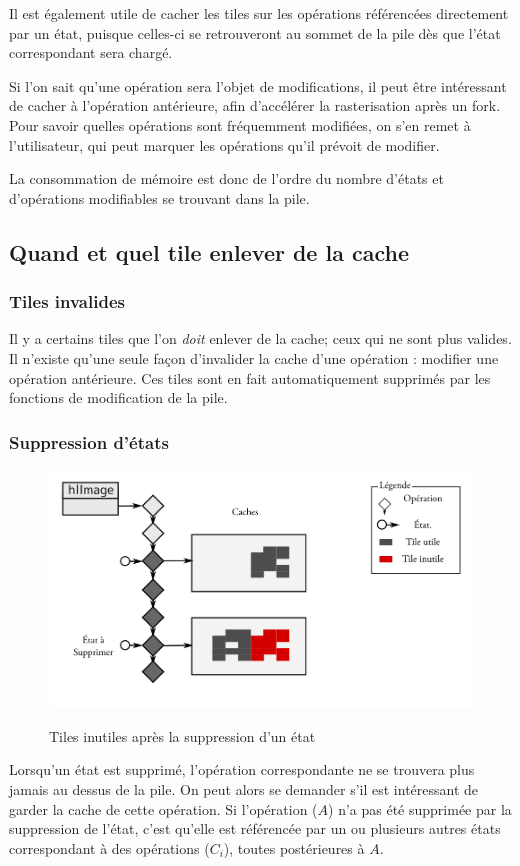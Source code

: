 			Il est également utile de cacher les tiles sur les opérations référencées directement par un état, puisque
			celles-ci se retrouveront au sommet de la pile dès que l'état correspondant sera chargé. 

			Si l'on sait qu'une opération sera l'objet de modifications, il peut être intéressant de cacher à l'opération
			antérieure, afin d'accélérer la rasterisation après un fork. Pour savoir quelles opérations sont fréquemment
			modifiées, on s'en remet à l'utilisateur, qui peut marquer les opérations qu'il prévoit de modifier. 

			La consommation de mémoire est donc de l'ordre du nombre d'états et d'opérations modifiables se trouvant dans la pile.
		\subsection{Quand et quel tile enlever de la cache}
			\subsubsection{Tiles invalides}
			Il y a certains tiles que l'on \emph{doit} enlever de la cache; ceux qui ne sont plus valides. Il n'existe qu'une 
			seule façon d'invalider la cache d'une opération : modifier une opération antérieure. Ces tiles sont en fait
			automatiquement supprimés par les fonctions de modification de la pile.
			
			\subsubsection{Suppression d'états}
		\begin{figure}[ht]
			\centering
			\includegraphics[width=\textwidth]{images/state-destruct} 
			\label{fig:destruct}
			\caption{Tiles inutiles après la suppression d'un état}
		\end{figure}
			Lorsqu'un état est supprimé, l'opération correspondante ne se trouvera plus jamais au dessus de la pile. On peut alors se
			demander s'il est intéressant de garder la cache de cette opération. Si l'opération ($A$) n'a pas été supprimée par la suppression
			de l'état, c'est qu'elle est référencée par un ou plusieurs autres états correspondant à des opérations ($C_i$), toutes postérieures à
			$A$. 

